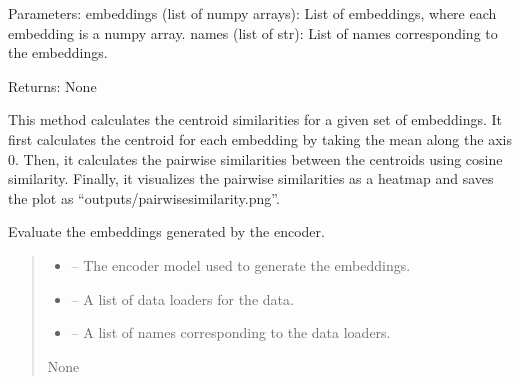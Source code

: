 \documentclass[letterpaper,10pt,english]{sphinxhowto}
\begin{document}
\begin{fulllineitems}
\begin{fulllineitems}
\sphinxAtStartPar
Parameters:
embeddings (list of numpy arrays): List of embeddings, where each embedding is a numpy array.
names (list of str): List of names corresponding to the embeddings.

\sphinxAtStartPar
Returns:
None

\sphinxAtStartPar
This method calculates the centroid similarities for a given set of embeddings. It first calculates the centroid
for each embedding by taking the mean along the axis 0. Then, it calculates the pairwise similarities between
the centroids using cosine similarity. Finally, it visualizes the pairwise similarities as a heatmap and saves
the plot as “outputs/pairwise\sphinxhyphen{}similarity.png”.

\end{fulllineitems}


\begin{fulllineitems}
\label{\detokenize{top:id2}}
\pysigstartsignatures
{}
\pysigstopsignatures
\sphinxAtStartPar
Evaluate the embeddings generated by the encoder.
\begin{quote}\begin{description}
\begin{itemize}
\item {} 
\sphinxAtStartPar
{} – The encoder model used to generate the embeddings.

\item {} 
\sphinxAtStartPar
{} – A list of data loaders for the data.

\item {} 
\sphinxAtStartPar
{} – A list of names corresponding to the data loaders.

\end{itemize}

\sphinxAtStartPar
None

\end{description}\end{quote}


\end{fulllineitems}
\end{fulllineitems}
\end{document}
